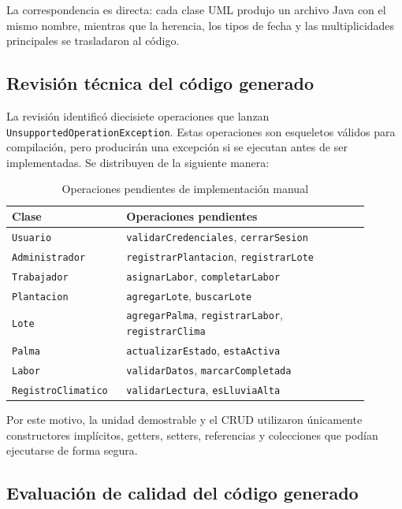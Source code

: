 La correspondencia es directa: cada clase UML produjo un archivo Java con el mismo nombre, mientras que la herencia, los tipos de fecha y las multiplicidades principales se trasladaron al código.

\subsection{Revisión técnica del código generado}

La revisión identificó diecisiete operaciones que lanzan \texttt{UnsupportedOperationException}. Estas operaciones son esqueletos válidos para compilación, pero producirán una excepción si se ejecutan antes de ser implementadas. Se distribuyen de la siguiente manera:

\begin{table}[htbp]
\centering
\small
\caption{Operaciones pendientes de implementación manual}
\begin{tabular}{|p{0.27\linewidth}|p{0.63\linewidth}|}
\hline
\textbf{Clase} & \textbf{Operaciones pendientes} \\
\hline
\texttt{Usuario} & \texttt{validarCredenciales}, \texttt{cerrarSesion} \\
\hline
\texttt{Administrador} & \texttt{registrarPlantacion}, \texttt{registrarLote} \\
\hline
\texttt{Trabajador} & \texttt{asignarLabor}, \texttt{completarLabor} \\
\hline
\texttt{Plantacion} & \texttt{agregarLote}, \texttt{buscarLote} \\
\hline
\texttt{Lote} & \texttt{agregarPalma}, \texttt{registrarLabor}, \texttt{registrarClima} \\
\hline
\texttt{Palma} & \texttt{actualizarEstado}, \texttt{estaActiva} \\
\hline
\texttt{Labor} & \texttt{validarDatos}, \texttt{marcarCompletada} \\
\hline
\texttt{RegistroClimatico} & \texttt{validarLectura}, \texttt{esLluviaAlta} \\
\hline
\end{tabular}
\end{table}

Por este motivo, la unidad demostrable y el CRUD utilizaron únicamente constructores implícitos, getters, setters, referencias y colecciones que podían ejecutarse de forma segura.

\subsection{Evaluación de calidad del código generado}

